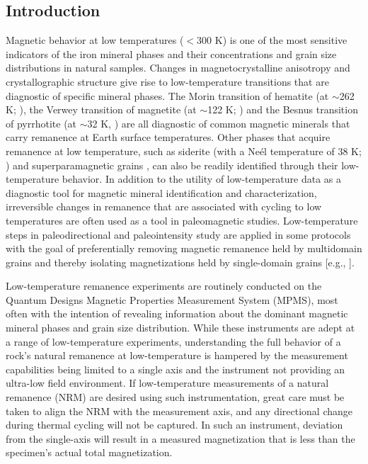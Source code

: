 \documentclass[draft,gc]{AGUTeX}
\begin{document}
\begin{article}

%
%

\section{Introduction}

Magnetic behavior at low temperatures ($<$300 K) is one of the most sensitive indicators of the iron mineral phases and their  concentrations and grain size distributions in natural samples. Changes in magnetocrystalline anisotropy and crystallographic structure give rise to low-temperature transitions that are diagnostic of specific mineral phases. The Morin transition of hematite (at $\sim$262 K; \cite{Morin1950a}), the Verwey transition of magnetite (at $\sim$122 K; \cite{Verwey1939a}) and the Besnus transition of pyrrhotite (at $\sim$32 K, \cite{Besnus1964a}) are all diagnostic of common magnetic minerals that carry remanence at Earth surface temperatures. Other phases that acquire remanence at low temperature, such as siderite (with a Ne\'el temperature of 38 K; \cite{Frederichs2003a}) and superparamagnetic grains \citep{Worm1999a}, can also be readily identified through their low-temperature behavior. In addition to the utility of low-temperature data as a diagnostic tool for magnetic mineral identification and characterization, irreversible changes in remanence that are associated with cycling to low temperatures are often used as a tool in paleomagnetic studies. Low-temperature steps in paleodirectional and paleointensity study are applied in some protocols with the goal of preferentially removing magnetic remanence held by multidomain grains and thereby isolating magnetizations held by single-domain grains [e.g., \cite{Schmidt1993c,Dunlop2003a, Yamamoto2003a}].

Low-temperature remanence experiments are routinely conducted on the Quantum Designs Magnetic Properties Measurement System (MPMS), most often with the intention of revealing information about the dominant magnetic mineral phases and grain size distribution. While these instruments are adept at a range of low-temperature experiments, understanding the full behavior of a rock's natural remanence at low-temperature is hampered by the measurement capabilities being limited to a single axis and the instrument not providing an ultra-low field environment. If low-temperature measurements of a natural remanence (NRM) are desired using such instrumentation, great care must be taken to align the NRM with the measurement axis, and any directional change during thermal cycling will not be captured. In such an instrument, deviation from the single-axis will result in a measured magnetization that is less than the specimen's actual total magnetization.


\end{article}
\end{document}
